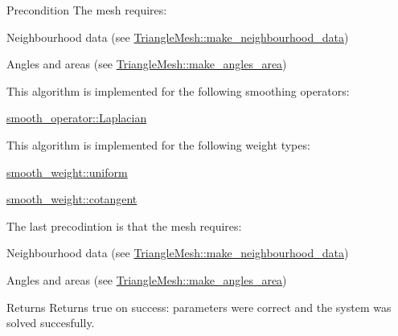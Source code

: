\begin{DoxyPrecond}{Precondition}
The mesh requires\+:
\begin{DoxyItemize}
\item Neighbourhood data (see \hyperlink{classgeoproc_1_1TriangleMesh_a84003dfdfd5e591c00f01a797578ff1f}{Triangle\+Mesh\+::make\+\_\+neighbourhood\+\_\+data})
\item Angles and areas (see \hyperlink{classgeoproc_1_1TriangleMesh_a4657d7986fd9905c3a7b759e3d1b5442}{Triangle\+Mesh\+::make\+\_\+angles\+\_\+area}) 
\end{DoxyItemize}

This algorithm is implemented for the following smoothing operators\+:
\begin{DoxyItemize}
\item \hyperlink{namespacegeoproc_1_1smoothing_a64c2bfd1dda6cfbf39afa2e61fd62537a799723f39baf497704a3d39e7c03555f}{smooth\+\_\+operator\+::\+Laplacian} 
\end{DoxyItemize}

This algorithm is implemented for the following weight types\+:
\begin{DoxyItemize}
\item \hyperlink{namespacegeoproc_1_1smoothing_a76e43f405426c150569712512de58028aa489ffed938ef1b9e86889bc413501ee}{smooth\+\_\+weight\+::uniform}
\item \hyperlink{namespacegeoproc_1_1smoothing_a76e43f405426c150569712512de58028a8e8ea879f40475ae2c70be8b296bf950}{smooth\+\_\+weight\+::cotangent} 
\end{DoxyItemize}

The last precodintion is that the mesh requires\+:
\begin{DoxyItemize}
\item Neighbourhood data (see \hyperlink{classgeoproc_1_1TriangleMesh_a84003dfdfd5e591c00f01a797578ff1f}{Triangle\+Mesh\+::make\+\_\+neighbourhood\+\_\+data})
\item Angles and areas (see \hyperlink{classgeoproc_1_1TriangleMesh_a4657d7986fd9905c3a7b759e3d1b5442}{Triangle\+Mesh\+::make\+\_\+angles\+\_\+area}) 
\end{DoxyItemize}
\end{DoxyPrecond}
\begin{DoxyReturn}{Returns}
Returns true on success\+: parameters were correct and the system was solved succesfully. 
\end{DoxyReturn}
